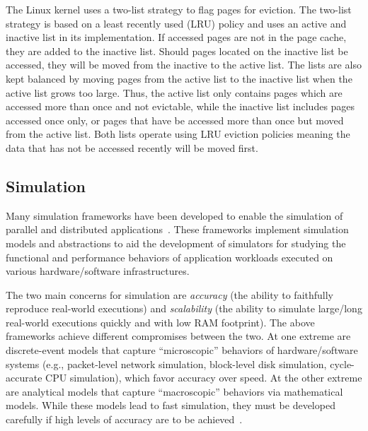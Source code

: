 \documentclass[conference]{IEEEtran}
\begin{document}
        The Linux kernel uses a two-list strategy to flag pages for eviction.
        The two-list strategy is based on a least recently used (LRU) policy
        and uses an active and inactive list in its implementation.
        If accessed pages are not in the page cache, they are added to the inactive list.
        Should pages located on the inactive list be accessed, they will be moved from
        the inactive to the active list.
        The lists are also kept balanced by moving pages from the active list
        to the inactive list when the active list grows too large.
        Thus, the active list only contains pages which are accessed more than once
        and not evictable, while the inactive list includes pages accessed once only,
        or pages that have be accessed more than once but moved from the active list.
        Both lists operate using LRU eviction policies meaning the data that has
        not be accessed recently will be moved first.

        \subsection{Simulation}

        Many simulation frameworks have been developed to enable the
        simulation of parallel and distributed
        applications~\cite{optorsim, gridsim, groudsim, cloudsim,
        nunez2012simcan,nunez2012icancloud, mdcsim, dissect_cf,
        cloudnetsimplusplus, fognetsimplusplus, casanova2014simgrid,
        ROSS, casanova2020fgcs}. These frameworks implement simulation
        models and abstractions to aid the development of simulators
        for studying the functional and performance behaviors of
        application workloads executed on various hardware/software
        infrastructures. 

        The two main concerns for simulation are \emph{accuracy}
        (the ability to faithfully reproduce real-world executions) and
        \emph{scalability}  (the ability to simulate large/long real-world
        executions quickly and with low RAM footprint). The above
        frameworks achieve different compromises between the two.  At
        one extreme are discrete-event models that capture
        ``microscopic'' behaviors of hardware/software systems (e.g.,
        packet-level network simulation, block-level disk simulation,
        cycle-accurate CPU simulation), which favor accuracy over
        speed.  At the other extreme are analytical models that capture
        ``macroscopic'' behaviors via mathematical models.  While these
        models lead to fast simulation, they must be developed
        carefully if high levels of accuracy are to be
        achieved~\cite{velhoTOMACS2013}. 
\end{document}
